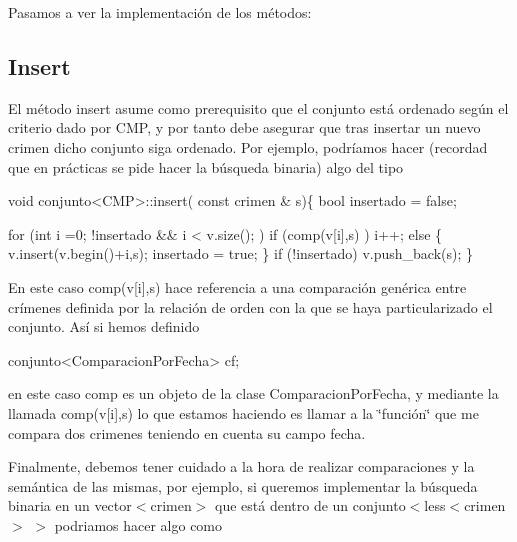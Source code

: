 Pasamos a ver la implementación de los métodos\+:\hypertarget{index_insert}{}\subsection{Insert}\label{index_insert}
El método insert asume como prerequisito que el conjunto está ordenado según el criterio dado por C\+M\+P, y por tanto debe asegurar que tras insertar un nuevo crimen dicho conjunto siga ordenado. Por ejemplo, podríamos hacer (recordad que en prácticas se pide hacer la búsqueda binaria) algo del tipo 
\begin{DoxyCode}
\textcolor{keywordtype}{void} conjunto<CMP>::insert( \textcolor{keyword}{const} crimen & s)\{
        \textcolor{keywordtype}{bool} insertado = \textcolor{keyword}{false};

        \textcolor{keywordflow}{for} (\textcolor{keywordtype}{int} i =0; !insertado && i < v.size(); )
            \textcolor{keywordflow}{if} (comp(v[i],s) ) i++;
            \textcolor{keywordflow}{else} \{
              v.insert(v.begin()+i,s);
              insertado = \textcolor{keyword}{true};
            \}
        \textcolor{keywordflow}{if} (!insertado) v.push\_back(s);
     \}
\end{DoxyCode}


En este caso comp(v\mbox{[}i\mbox{]},s) hace referencia a una comparación genérica entre crímenes definida por la relación de orden con la que se haya particularizado el conjunto. Así si hemos definido


\begin{DoxyCode}
conjunto<ComparacionPorFecha> cf;
\end{DoxyCode}


en este caso comp es un objeto de la clase Comparacion\+Por\+Fecha, y mediante la llamada comp(v\mbox{[}i\mbox{]},s) lo que estamos haciendo es llamar a la \char`\"{}función\char`\"{} que me compara dos crimenes teniendo en cuenta su campo fecha.

Finalmente, debemos tener cuidado a la hora de realizar comparaciones y la semántica de las mismas, por ejemplo, si queremos implementar la búsqueda binaria en un vector$<$crimen$>$ que está dentro de un conjunto$<$less$<$crimen$>$ $>$ podriamos hacer algo como


